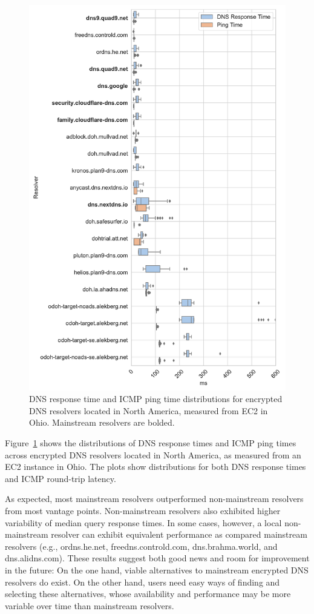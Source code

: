 \begin{figure}[!htbp]
\centering
\includegraphics[width=0.6\columnwidth]{figures/ohio_NA.pdf}
\caption{DNS response time and ICMP ping time distributions for
    encrypted DNS resolvers located in North America, measured from EC2 in Ohio. Mainstream resolvers are bolded.}
    \label{fig:dns-us-ohio}
\end{figure}

Figure~\ref{fig:dns-us-ohio} shows the distributions of DNS response times and
ICMP ping times across encrypted DNS resolvers located in North America, as
measured from an EC2 instance in Ohio. The plots show distributions for both DNS response times and ICMP round-trip latency.

As expected, most mainstream resolvers outperformed non-mainstream resolvers from most vantage points. Non-mainstream resolvers also exhibited higher variability of median query response times. In some cases, however, a local non-mainstream resolver can exhibit equivalent performance as compared mainstream resolvers (e.g., ordns.he.net, freedns.controld.com, dns.brahma.world, and dns.alidns.com). These results suggest both good news and room for improvement in the future: On the one hand, viable alternatives to mainstream encrypted DNS resolvers do exist. On the other hand, users need easy ways of finding and selecting these alternatives, whose availability and performance may be more variable over time than mainstream resolvers.

